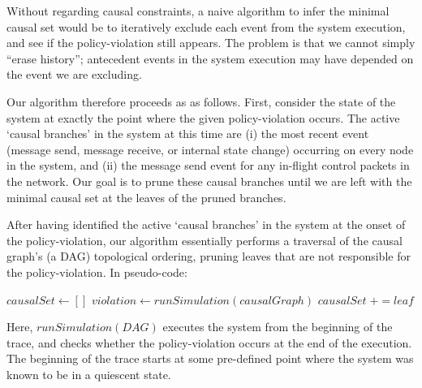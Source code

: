 Without regarding causal constraints, a naive algorithm to infer the minimal
causal set would be to iteratively
exclude each event from the system execution, and see if the policy-violation
still appears. The problem is that we cannot simply ``erase history'';
antecedent events in the system execution may have depended on the event we
are excluding.

Our algorithm therefore proceeds as as follows. First, consider
the state of the system at exactly the point where the given policy-violation
occurs. The active `causal branches' in the system at this time are (i) the
most recent event (message send, message receive, or internal state change)
occurring on every node in the system, and (ii) the message send event for any
in-flight control packets in the network. Our goal is to prune these causal
branches until we are left with the minimal causal set at the leaves of the
pruned branches.


After having identified the active `causal branches' in the system at the
onset of the policy-violation, our algorithm essentially performs a
traversal of the causal graph's (a DAG) topological ordering, pruning leaves that are not
responsible for the policy-violation. In pseudo-code:

\begin{algorithmic}
\State $causalSet \gets []$
    \State $violation \gets runSimulation(causalGraph)$
        \State $causalSet\;+= leaf$
    \EndIf
\EndWhile
\end{algorithmic}

Here, $runSimulation(DAG)$ executes the system from the beginning of the
trace, and checks whether the policy-violation occurs at the end of the
execution. The beginning of the trace starts at some pre-defined point where
the system was known to be in a quiescent state.

